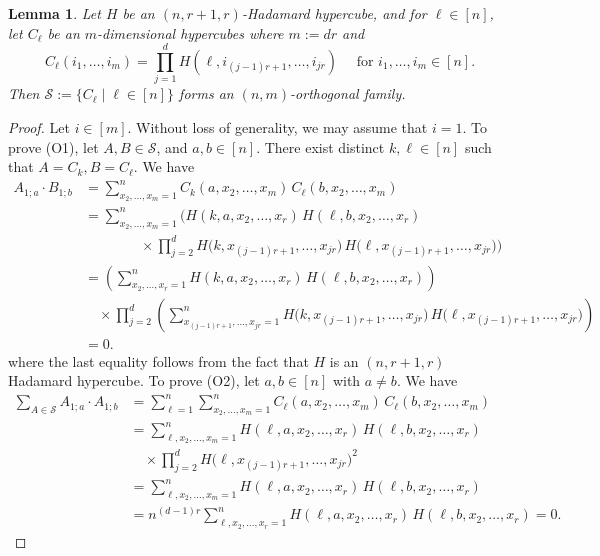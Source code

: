 \documentclass[11pt,oneside]{amsart}
\newtheorem{lemma}[theorem]{Lemma}
\begin{document}
{\begin{lemma}\label{lem:constA1}
    Let $H$ be an $(n,r+1,r)$-Hadamard hypercube, and for $\ell\in [n]$, let $C_\ell$ be an $m$-dimensional hypercubes where $m:=dr$ and 
$$    
C_\ell(i_1,\ldots, i_{m})=\prod_{j=1}^{d} H(\ell,i_{(j-1)r+1},\ldots, i_{jr}) \quad\text{ for } i_1,\dots,i_{m}\in [n].
$$    
Then  $\mathcal{S}:=\{C_\ell \mid \ell\in [n]\}$ forms an $(n, m)$-orthogonal family.
\end{lemma}
\begin{proof}
    Let $i\in [m]$. Without loss of generality, we may assume that $i=1$.  
To prove (O1), let  $A,B\in \mathcal{S}$,  and  $a,b\in [n]$. There exist distinct $k,\ell\in [n]$ such that    $A=C_k, B=C_\ell$.  
    We have  
\begin{align*}
A_{1;a}\cdot B_{1;b}
&= \sum_{x_2,\ldots,x_m=1}^n 
C_k(a, x_2,\ldots, x_m)\,C_{\ell}(b, x_2,\ldots, x_m) \\
&= \sum_{x_2,\ldots,x_m=1}^n 
\Big(
H(k, a, x_2,\ldots, x_r)\,H(\ell, b, x_2,\ldots, x_r) \\
&\qquad\qquad \times \prod_{j=2}^{d} 
H\big(k, x_{(j-1)r+1},\ldots, x_{jr}\big)\,
H\big(\ell, x_{(j-1)r+1},\ldots, x_{jr}\big)
\Big) \\
&= \left(\sum_{x_2,\ldots,x_r=1}^n
H(k,a,x_2,\ldots,x_r)\,
H(\ell,b,x_2,\ldots,x_r)\right) \\
&\quad \times \prod_{j=2}^{d}
\left(\sum_{x_{(j-1)r+1},\ldots,x_{jr}=1}^n
H\big(k,x_{(j-1)r+1},\ldots,x_{jr}\big)\,
H\big(\ell,x_{(j-1)r+1},\ldots,x_{jr}\big)\right) \\
&= 0.
\end{align*}    
    where the last equality follows from the fact that $H$ is an $(n,r+1,r)$ Hadamard hypercube. To prove (O2), let $a,b\in [n]$ with $a\neq b$. We have
\begin{align*}
\sum_{A\in \mathcal{S}} A_{1;a}\cdot A_{1;b}
&= \sum_{\ell=1}^n \sum_{x_2,\ldots,x_m=1}^n
C_\ell(a, x_2,\ldots, x_m)\,C_\ell(b, x_2,\ldots, x_m) \\
&= \sum_{\ell,x_2,\ldots,x_m=1}^n
H(\ell, a,x_2,\ldots, x_r)\,
H(\ell, b,x_2,\ldots, x_r) \\
&\quad \times \prod_{j=2}^{d}
H\big(\ell, x_{(j-1)r+1},\ldots, x_{jr}\big)^2 \\
&= \sum_{\ell,x_2,\ldots,x_m=1}^n
H(\ell, a,x_2,\ldots, x_r)\,
H(\ell, b,x_2,\ldots, x_r) \\
&= n^{(d-1)r}
\sum_{\ell,x_2,\ldots,x_r=1}^n
H(\ell, a,x_2,\ldots, x_r)\,
H(\ell, b,x_2,\ldots, x_r) = 0.
\end{align*}  

\end{proof}}
\end{document}
